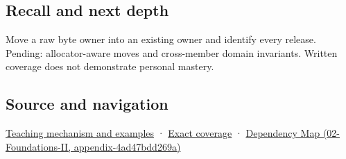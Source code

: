 \subsection{Recall and next depth}\label{recall-and-next-depth}

Move a raw byte owner into an existing owner and identify every release. Pending: allocator-aware moves and cross-member domain invariants. Written coverage does not demonstrate personal mastery.

\subsection{Source and navigation}\label{source-and-navigation}

\href{Continuous\%20Notes/Computing\%20Foundations\%20-\%20From\%20Bits\%20to\%20C++\%20and\%20Systems\%20APIs\#A\%20move\%20transfers\%20responsibility\%20while\%20the\%20source\%20survives}{Teaching mechanism and examples} · \hyperref[appendix-fd090d982a15]{Exact coverage} · \href{}{Dependency Map (02-Foundations-II, appendix-4ad47bdd269a)}
